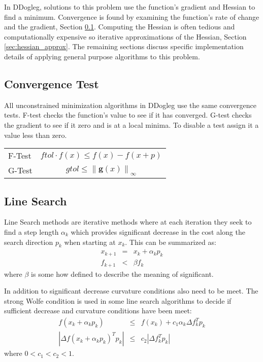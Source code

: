 \documentclass[peerreview,compsoc,onecolumn]{IEEEtran}
\newcommand{\norm}[1]{\left\lVert#1\right\rVert}
\begin{document}
In DDogleg, solutions to this problem use the function's gradient and Hessian to find a minimum. Convergence is found by examining the function's rate of change and the gradient, Section \ref{sec:unmin_convergence}. Computing the Hessian is often tedious and computationally expensive so iterative approximations of the Hessian, Section \ref{sec:hessian_approx}. The remaining sections discuss specific implementation details of applying general purpose algorithms to this problem.

\subsection{Convergence Test}
\label{sec:unmin_convergence}

All unconstrained minimization algorithms in DDogleg use the same convergence tests. F-test checks the function's value to see if it has converged. G-test checks the gradient to see if it zero and is at a local minima. To disable a test assign it a value less than zero.

\begin{center}
\begin{tabular}{lc}
F-Test & $ftol \cdot f(x)  \leq f(x) - f(x+p)$ \\
G-Test & $gtol \leq \norm{\bm{g}(x)}_\infty$ 
\end{tabular}
\end{center}
 
\subsection{Line Search}

Line Search methods are iterative methods where at each iteration they seek to find a step length $\alpha_k$ which provides significant decrease in the cost along the search direction $p_k$ when starting at $x_k$. This can be summarized as:
\begin{eqnarray}
x_{k+1} & = & x_k + \alpha_k p_k \\
f_{k+1} & < & \beta f_k
\end{eqnarray}
where $\beta$ is some how defined to describe the meaning of significant.

In addition to significant decrease curvature conditions also need to be meet. The strong Wolfe condition is used in some line search algorithms to decide if sufficient decrease and curvature conditions have been meet:
\begin{eqnarray}
f(x_k + \alpha_k p_k) &\le& f(x_k) + c_1 \alpha_k \Delta f^T_k p_k \\
|\Delta f(x_k + \alpha_k p_k)^T p_k| &\le& c_2 |\Delta f_k^T p_k|
\end{eqnarray}
where $0 < c_1 < c_2 < 1$.
\end{document}
